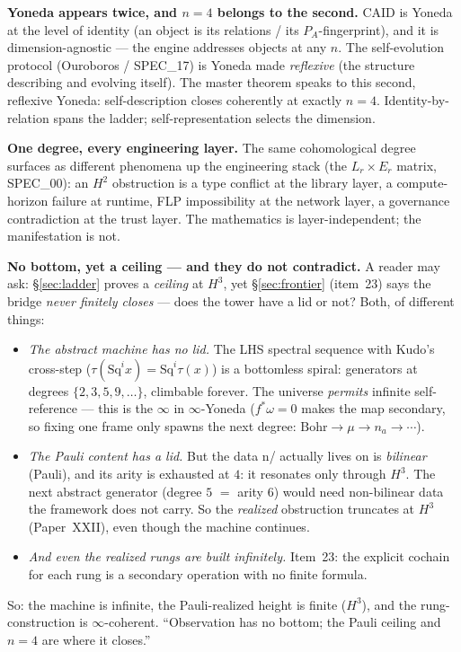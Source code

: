 \documentclass[11pt,a4paper]{article}
\newcommand{\Sq}{\mathrm{Sq}}
\theoremstyle{plain}
\theoremstyle{definition}
\theoremstyle{remark}
\begin{document}
\textbf{Yoneda appears twice, and $n=4$ belongs to the second.} CAID is Yoneda at
the level of identity (an object is its relations / its $P_A$-fingerprint), and it
is dimension-agnostic --- the engine addresses objects at any $n$. The
self-evolution protocol (Ouroboros / SPEC\_17) is Yoneda made \emph{reflexive}
(the structure describing and evolving itself). The master theorem speaks to this
second, reflexive Yoneda: self-description closes coherently at exactly $n=4$.
Identity-by-relation spans the ladder; self-representation selects the dimension.

\textbf{One degree, every engineering layer.} The same cohomological degree
surfaces as different phenomena up the engineering stack (the $L_r\times E_r$
matrix, SPEC\_00): an $H^2$ obstruction is a type conflict at the library layer,
a compute-horizon failure at runtime, FLP impossibility at the network layer, a
governance contradiction at the trust layer. The mathematics is layer-independent;
the manifestation is not.

\textbf{No bottom, yet a ceiling --- and they do not contradict.} A reader may ask:
\S\ref{sec:ladder} proves a \emph{ceiling} at $H^3$, yet \S\ref{sec:frontier}
(item~23) says the bridge \emph{never finitely closes} --- does the tower have a
lid or not? Both, of different things:
\begin{itemize}
  \item \emph{The abstract machine has no lid.} The LHS spectral sequence with
  Kudo's cross-step ($\tau(\Sq^i x)=\Sq^i\tau(x)$) is a bottomless spiral:
  generators at degrees $\{2,3,5,9,\dots\}$, climbable forever. The universe
  \emph{permits} infinite self-reference --- this is the $\infty$ in $\infty$-Yoneda
  ($f^*\omega=0$ makes the map secondary, so fixing one frame only spawns the next
  degree: $\text{Bohr}\to\mu\to n_a\to\cdots$).
  \item \emph{The Pauli content has a lid.} But the data n/ actually lives on is
  \emph{bilinear} (Pauli), and its arity is exhausted at $4$: it resonates only
  through $H^3$. The next abstract generator (degree $5$ $=$ arity $6$) would need
  non-bilinear data the framework does not carry. So the \emph{realized}
  obstruction truncates at $H^3$ (Paper~XXII), even though the machine continues.
  \item \emph{And even the realized rungs are built infinitely.} Item~23: the
  explicit cochain for each rung is a secondary operation with no finite formula.
\end{itemize}
So: the machine is infinite, the Pauli-realized height is finite ($H^3$), and the
rung-construction is $\infty$-coherent. ``Observation has no bottom; the Pauli
ceiling and $n=4$ are where it closes.''
\end{document}
